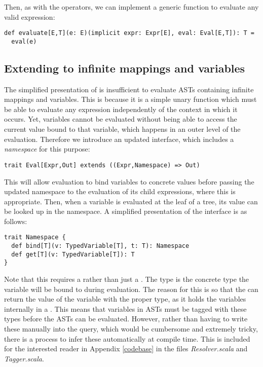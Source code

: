 Then, as with the operators, we can implement a generic function to evaluate any valid expression:
\vs\begin{lstlisting}
def evaluate[E,T](e: E)(implicit expr: Expr[E], eval: Eval[E,T]): T =
  eval(e)
\end{lstlisting}\vs

\subsection{Extending to infinite mappings and variables}
The simplified presentation of  is insufficient to evaluate ASTs containing infinite mappings and variables. This is because it is a simple unary function which must be able to evaluate any expression independently of the context in which it occurs. Yet, variables cannot be evaluated without being able to access the current value bound to that variable, which happens in an outer level of the evaluation.
Therefore we introduce an updated interface, which includes a \textit{namespace} for this purpose:
\vs\begin{lstlisting}
trait Eval[Expr,Out] extends ((Expr,Namespace) => Out)
\end{lstlisting}\vs
This will allow evaluation to bind variables to concrete values before passing the updated namespace to the evaluation of its child expressions, where this is appropriate. Then, when a variable is evaluated at the leaf of a tree, its value can be looked up in the namespace. A simplified presentation of the  interface is as follows:
\vs\begin{lstlisting}
trait Namespace {
  def bind[T](v: TypedVariable[T], t: T): Namespace
  def get[T](v: TypedVariable[T]): T
}
\end{lstlisting}\vs
Note that this requires a  rather than just a . The type  is the concrete type the variable will be bound to during evaluation. The reason for this is so that the  can return the value of the variable with the proper type, as it holds the variables internally in a . This means that variables in ASTs must be tagged with these types before the ASTs can be evaluated. However, rather than having to write these manually into the query, which would be cumbersome and extremely tricky, there is a process to infer these automatically at compile time. This is included for the interested reader in Appendix \ref{codebase} in the files \textit{Resolver.scala} and \textit{Tagger.scala}.

